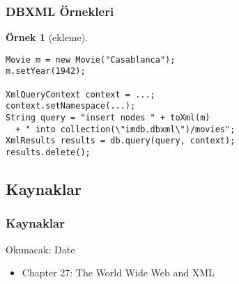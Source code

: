 \documentclass[dvipsnames]{beamer}
\theoremstyle{definition}
\theoremstyle{example}
\newtheorem{ornek}[theorem]{Örnek}
\theoremstyle{plain}
\begin{document}
\begin{frame}[fragile]
  \frametitle{DBXML Örnekleri}

  \begin{ornek}[ekleme]
    \begin{lstlisting}
Movie m = new Movie("Casablanca");
m.setYear(1942);

XmlQueryContext context = ...;
context.setNamespace(...);
String query = "insert nodes " + toXml(m)
  + " into collection(\"imdb.dbxml\")/movies";
XmlResults results = db.query(query, context);
results.delete();
    \end{lstlisting}
  \end{ornek}
\end{frame}

\subsection*{Kaynaklar}

\begin{frame}
  \frametitle{Kaynaklar}

  \begin{block}{Okunacak: Date}
    \begin{itemize}
      \item Chapter 27: \alert{The World Wide Web and XML}
    \end{itemize}
  \end{block}
\end{frame}
\end{document}
